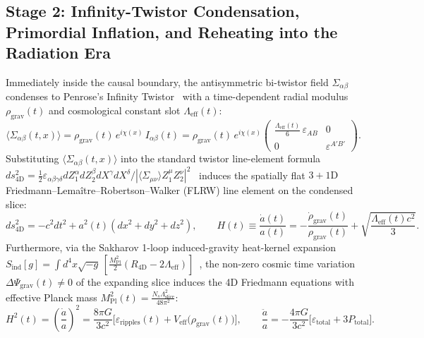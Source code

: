 \documentclass[11pt,a4paper]{article}
\begin{document}
\subsection{Stage 2: Infinity-Twistor Condensation, Primordial Inflation, and Reheating into the Radiation Era}
Immediately inside the causal boundary, the antisymmetric bi-twistor field $\Sigma_{\alpha\beta}$ condenses to Penrose's Infinity Twistor~\cite{PenroseRindler1984} with a time-dependent radial modulus $\rho_{\text{grav}}(t)$ and cosmological constant slot $\Lambda_{\text{eff}}(t)$:
\begin{equation}
\langle \Sigma_{\alpha\beta}(t, x) \rangle = \rho_{\text{grav}}(t)\, e^{i\chi(x)}\, I_{\alpha\beta}(t) = \rho_{\text{grav}}(t)\, e^{i\chi(x)} \begin{pmatrix} \frac{\Lambda_{\text{eff}}(t)}{6}\,\varepsilon_{AB} & 0 \\ 0 & \varepsilon^{A'B'} \end{pmatrix}.
\end{equation}
Substituting $\langle\Sigma_{\alpha\beta}(t,x)\rangle$ into the standard twistor line-element formula $ds_{4\text{D}}^2 = \frac{1}{2}\varepsilon_{\alpha\beta\gamma\delta}dZ_1^\alpha dZ_2^\beta dX^\gamma dX^\delta / |\langle\Sigma_{\mu\nu}\rangle Z_1^\mu Z_2^\nu|^2$~\cite{PenroseRindler1984} induces the spatially flat $3+1\text{D}$ Friedmann--Lema\^itre--Robertson--Walker (FLRW) line element on the condensed slice:
\begin{equation}
ds_{4\text{D}}^2 = -c^2 dt^2 + a^2(t)\left( dx^2 + dy^2 + dz^2 \right), \qquad H(t) \equiv \frac{\dot{a}(t)}{a(t)} = -\frac{\dot{\rho}_{\text{grav}}(t)}{\rho_{\text{grav}}(t)} + \sqrt{\frac{\Lambda_{\text{eff}}(t) c^2}{3}}.
\end{equation}
Furthermore, via the Sakharov 1-loop induced-gravity heat-kernel expansion $S_{\text{ind}}[g] = \int d^4x\sqrt{-g}\,[\frac{M_{\text{Pl}}^2}{2}(R_{4\text{D}} - 2\Lambda_{\text{eff}})]$~\cite{Sakharov1967}, the non-zero cosmic time variation $\Delta\Psi_{\text{grav}}(t) \neq 0$ of the expanding slice induces the 4D Friedmann equations with effective Planck mass $M_{\text{Pl}}^2(t) = \frac{N_s \Lambda_{\text{slice}}^2}{48\pi^2}$:
\begin{equation}
H^2(t) = \left(\frac{\dot{a}}{a}\right)^2 = \frac{8\pi G}{3c^2} \Big[ \varepsilon_{\text{ripples}}(t) + V_{\text{eff}}\big(\rho_{\text{grav}}(t)\big) \Big], \qquad \frac{\ddot{a}}{a} = -\frac{4\pi G}{3c^2}\Big[ \varepsilon_{\text{total}} + 3 P_{\text{total}} \Big].
\end{equation}
\end{document}
